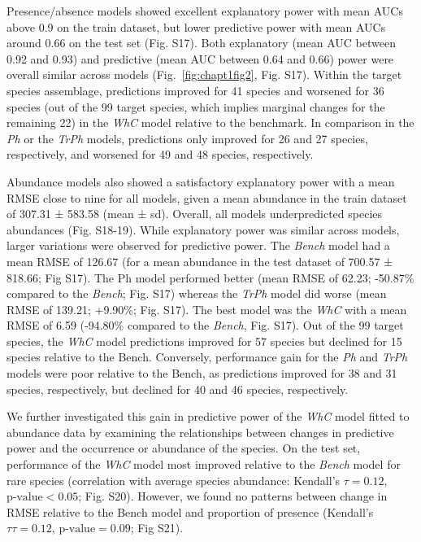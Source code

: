 \begin{refsection}
Presence/absence models showed excellent explanatory power with mean
AUCs above 0.9 on the train dataset, but lower predictive power with
mean AUCs around 0.66 on the test set (Fig. S17). Both explanatory (mean
AUC between 0.92 and 0.93) and predictive (mean AUC between 0.64 and
0.66) power were overall similar across models
(Fig.~\ref{fig:chapt1fig2}, Fig. S17). Within the target species
assemblage, predictions improved for 41 species and worsened for 36
species (out of the 99 target species, which implies marginal changes
for the remaining 22) in the \emph{WhC} model relative to the benchmark.
In comparison in the \emph{Ph} or the \emph{TrPh} models, predictions
only improved for 26 and 27 species, respectively, and worsened for 49
and 48 species, respectively.

Abundance models also showed a satisfactory explanatory power with a
mean RMSE close to nine for all models, given a mean abundance in the
train dataset of 307.31 ± 583.58 (mean ± sd). Overall, all models
underpredicted species abundances (Fig. S18-19). While explanatory power
was similar across models, larger variations were observed for
predictive power. The \emph{Bench} model had a mean RMSE of 126.67 (for
a mean abundance in the test dataset of 700.57 ± 818.66; Fig S17). The
Ph model performed better (mean RMSE of 62.23; -50.87\% compared to the
\emph{Bench}; Fig. S17) whereas the \emph{TrPh} model did worse (mean
RMSE of 139.21; +9.90\%; Fig. S17). The best model was the \emph{WhC}
with a mean RMSE of 6.59 (-94.80\% compared to the \emph{Bench}, Fig.
S17). Out of the 99 target species, the \emph{WhC} model predictions
improved for 57 species but declined for 15 species relative to the
Bench. Conversely, performance gain for the \emph{Ph} and \emph{TrPh}
models were poor relative to the Bench, as predictions improved for 38
and 31 species, respectively, but declined for 40 and 46 species,
respectively.

We further investigated this gain in predictive power of the \emph{WhC}
model fitted to abundance data by examining the relationships between
changes in predictive power and the occurrence or abundance of the
species. On the test set, performance of the \emph{WhC} model most
improved relative to the \emph{Bench} model for rare species
(correlation with average species abundance: Kendall's \(\tau = 0.12\),
\(\text{p-value} < 0.05\); Fig. S20). However, we found no patterns
between change in RMSE relative to the Bench model and proportion of
presence (Kendall's \(τ\tau = 0.12\), \(\text{p-value} = 0.09\); Fig
S21).


\end{refsection}
